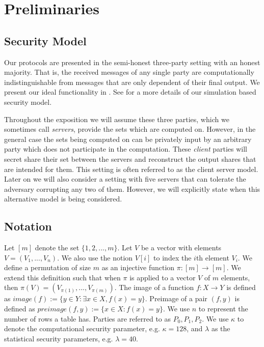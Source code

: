 \section{Preliminaries} \label{sec:prelim}


\subsection{Security Model}

Our protocols are presented in the semi-honest three-party setting with an honest majority. That is, the received messages of any single party are computationally indistinguishable from messages that are only dependent of their final output. We present our ideal functionality in . See \cite{highthroughput} for a more details of our simulation based security model. 


\iffullversion
Throughout the exposition we will assume these three parties, which we sometimes call \emph{servers}, provide the sets which are computed on. However, in the general case the sets being computed on can be privately input by an arbitrary party which does not participate in the computation. These \emph{client} parties will secret share their set between the servers and reconstruct the output shares that are intended for them. This setting is often referred to as the client server model\cite{aby3, secureML}. Later on we will also consider a setting with five servers that can tolerate the adversary corrupting any two of them. However, we will explicitly state when this alternative model is being considered.
\fi


\subsection{Notation}




Let $[m]$ denote the set $\{1,2,...,m\}$. Let $V$ be a vector with elements $V=(V_1,...,V_n)$. We also use the notion $V[i]$ to index the $i$th element $V_i$.
We define a permutation of size $m$ as an injective function $\pi : [m] \rightarrow [m]$. We extend this definition such that when $\pi$ is applied to a vector $V$ of $m$ elements, then  $\pi(V)=(V_{\pi(1)}, ..., V_{\pi(m)})$. The image of a function $f : X \rightarrow Y$ is defined as $image(f) := \{y\in Y : \exists x\in X, f(x)=y\}$. Preimage of a pair $(f,y)$ is defined as $preimage(f,y):=\{x\in X : f(x) = y\}$. We use $n$ to represent the number of rows a table has. Parties are referred to as $P_0,P_1,P_{2}$. We use $\kappa$ to denote the computational security parameter, e.g. $\kappa =128$, and $\lambda$ as the statistical security parameters, e.g. $\lambda=40$.

